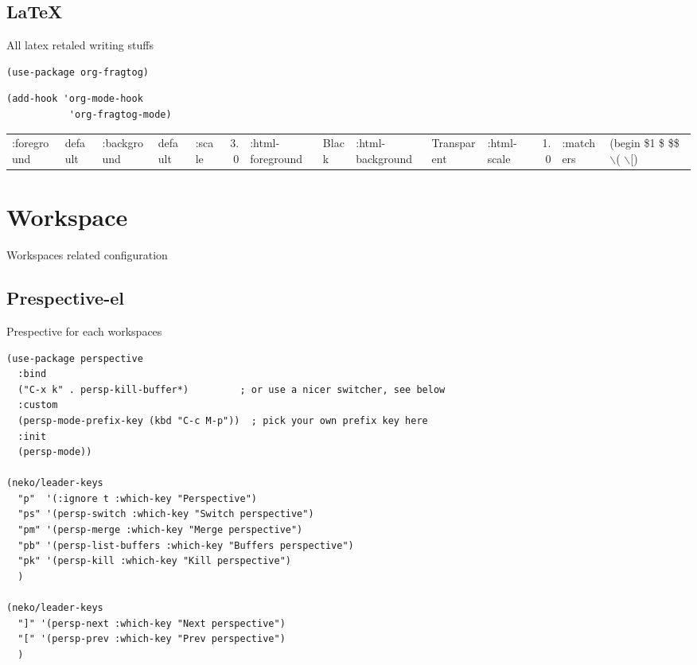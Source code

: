 \documentclass[11pt]{article}
\begin{document}
\subsection{\LaTeX{}}
\label{sec:org18af6c3}

All latex retaled writing stuffs

\begin{verbatim}
(use-package org-fragtog)
\end{verbatim}

\begin{verbatim}
(add-hook 'org-mode-hook
           'org-fragtog-mode)
\end{verbatim}

\begin{center}
\begin{tabular}{lllllrlllllrll}
:foreground & default & :background & default & :scale & 3.0 & :html-foreground & Black & :html-background & Transparent & :html-scale & 1.0 & :matchers & (begin \$1 \$ \$\$ $\backslash$( $\backslash$[)\\[0pt]
\end{tabular}
\end{center}

\section{Workspace}
\label{sec:orgd6b4324}

Workspaces related configuration

\subsection{Prespective-el}
\label{sec:org5a9135f}

Prespective for each workspaces

\begin{verbatim}
(use-package perspective
  :bind
  ("C-x k" . persp-kill-buffer*)         ; or use a nicer switcher, see below
  :custom
  (persp-mode-prefix-key (kbd "C-c M-p"))  ; pick your own prefix key here
  :init
  (persp-mode))

(neko/leader-keys
  "p"  '(:ignore t :which-key "Perspective")
  "ps" '(persp-switch :which-key "Switch perspective")
  "pm" '(persp-merge :which-key "Merge perspective")
  "pb" '(persp-list-buffers :which-key "Buffers perspective")
  "pk" '(persp-kill :which-key "Kill perspective")
  )

(neko/leader-keys
  "]" '(persp-next :which-key "Next perspective")
  "[" '(persp-prev :which-key "Prev perspective")
  )

\end{verbatim}
\end{document}
